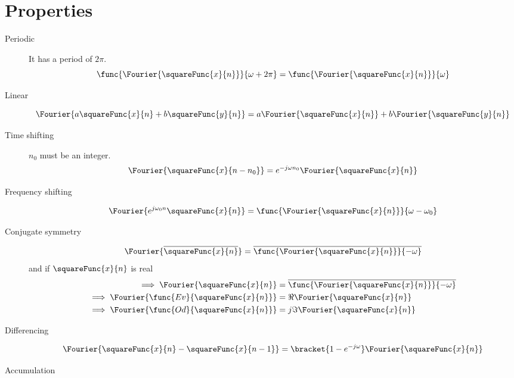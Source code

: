 \section{Properties}
\begin{description}
    \item[Periodic] It has a period of \(2\pi\).
    \begin{equation*}
        \func{\Fourier{\squareFunc{x}{n}}}{\omega + 2\pi} =\func{\Fourier{\squareFunc{x}{n}}}{\omega}
    \end{equation*} 
    \item[Linear]
    \begin{equation*}
        \Fourier{a\squareFunc{x}{n} + b \squareFunc{y}{n}} = a\Fourier{\squareFunc{x}{n}} + b\Fourier{\squareFunc{y}{n}}
    \end{equation*} 
    \item[Time shifting] \(n_0\) must be an integer.
    \begin{equation*}
        \Fourier{\squareFunc{x}{n - n_0}} = e^{-j\omega n_0} \Fourier{\squareFunc{x}{n}}
    \end{equation*}
    \item[Frequency shifting]
    \begin{equation*}
        \Fourier{e^{j\omega_0 n}\squareFunc{x}{n}} = \func{\Fourier{\squareFunc{x}{n}}}{\omega - \omega_0}
    \end{equation*}
    \item[Conjugate symmetry] 
    \begin{equation*}
        \Fourier{\overline{\squareFunc{x}{n}}}  = \overline{\func{\Fourier{\squareFunc{x}{n}}}{-\omega}}
    \end{equation*}
    and if \(\squareFunc{x}{n}\) is real
    \begin{align*}
        \implies \Fourier{\squareFunc{x}{n}} &= \overline{\func{\Fourier{\squareFunc{x}{n}}}{-\omega}}\\
        \implies \Fourier{\func{Ev}{\squareFunc{x}{n}}} &= \Re \Fourier{\squareFunc{x}{n}}\\
        \implies \Fourier{\func{Od}{\squareFunc{x}{n}}} &= j \Im \Fourier{\squareFunc{x}{n}}
    \end{align*}
    \item[Differencing]
    \begin{equation*}
        \Fourier{\squareFunc{x}{n} - \squareFunc{x}{n - 1}} = \bracket{1 - e^{-j\omega}} \Fourier{\squareFunc{x}{n}}
    \end{equation*}
    \item[Accumulation]

\end{description}
